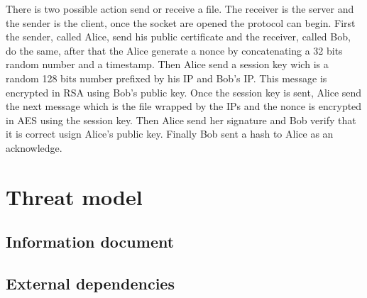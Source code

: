 \documentclass[a4paper,10pt]{article}
\begin{document}
There is two possible action send or receive a file. The receiver is the server and the sender is the client, once the socket are opened the protocol can begin. First the sender, called Alice, send his public certificate and the receiver, called Bob, do the same, after that the Alice generate a nonce by concatenating a 32 bits random number and a timestamp. Then Alice send a session key wich is a random 128 bits number prefixed by his IP and Bob's IP. This message is encrypted in RSA using Bob's public key. Once the session key is sent, Alice send the next message which is the file wrapped by the IPs and the nonce is encrypted in AES using the session key. Then Alice send her signature and Bob verify that it is correct usign Alice's public key. Finally Bob sent a hash to Alice as an acknowledge.


\section{Threat model}


\subsection{Information document}


\subsection{External dependencies}
\end{document}
